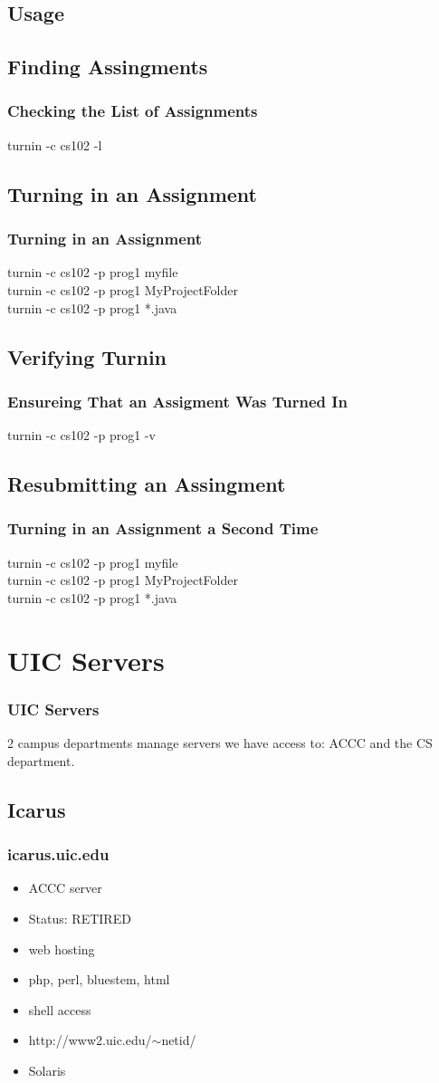 \documentclass[hyperref={pdfpagelabels=false}]{beamer}
\begin{document}
\subsection{Usage}
\subsection{Finding Assingments}
\frame
{
    \frametitle{Checking the List of Assignments}
	turnin -c cs102 -l
}
\subsection{Turning in an Assignment}
\frame
{
    \frametitle{Turning in an Assignment}
	turnin -c cs102 -p prog1 myfile\\
	turnin -c cs102 -p prog1 MyProjectFolder\\
	turnin -c cs102 -p prog1 *.java
}
\subsection{Verifying Turnin}
\frame
{
    \frametitle{Ensureing That an Assigment Was Turned In}
	turnin -c cs102 -p prog1 -v

}
\subsection{Resubmitting an Assingment}
\frame
{
    \frametitle{Turning in an Assignment a Second Time}
	turnin -c cs102 -p prog1 myfile\\
	turnin -c cs102 -p prog1 MyProjectFolder\\
	turnin -c cs102 -p prog1 *.java\\
	
}
\section{UIC Servers}
\frame
{
    \frametitle{UIC Servers}
    2 campus departments manage servers we have access to: ACCC and the CS department.
}
\subsection{Icarus}
\frame
{
    \frametitle{icarus.uic.edu}
    \begin{itemize}
    \item{ACCC server}
    \item{Status: RETIRED}
    \item{web hosting}
    \item{php, perl, bluestem, html}
    \item{shell access}
    \item{http://www2.uic.edu/$\sim$netid/}
    \item{Solaris}
    \end{itemize}
}
\end{document}
